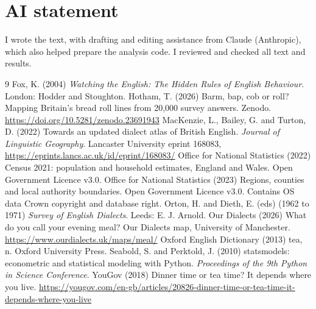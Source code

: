 \documentclass[11pt,a4paper]{article}
\begin{document}
\section*{AI statement}
I wrote the text, with drafting and editing assistance from Claude (Anthropic), which also helped prepare the analysis code. I reviewed and checked all text and results.

\begin{thebibliography}{9}
 Fox, K. (2004) \emph{Watching the English: The Hidden Rules of English Behaviour}. London: Hodder and Stoughton.
 Hotham, T. (2026) Barm, bap, cob or roll? Mapping Britain's bread roll lines from 20,000 survey answers. Zenodo. \url{https://doi.org/10.5281/zenodo.23691943}
 MacKenzie, L., Bailey, G. and Turton, D. (2022) Towards an updated dialect atlas of British English. \emph{Journal of Linguistic Geography}. Lancaster University eprint 168083, \url{https://eprints.lancs.ac.uk/id/eprint/168083/}
 Office for National Statistics (2022) Census 2021: population and household estimates, England and Wales. Open Government Licence v3.0.
 Office for National Statistics (2023) Regions, counties and local authority boundaries. Open Government Licence v3.0. Contains OS data \textcopyright{} Crown copyright and database right.
 Orton, H. and Dieth, E. (eds) (1962 to 1971) \emph{Survey of English Dialects}. Leeds: E. J. Arnold.
 Our Dialects (2026) What do you call your evening meal? Our Dialects map, University of Manchester. \url{https://www.ourdialects.uk/maps/meal/}
 Oxford English Dictionary (2013) tea, n. Oxford University Press.
 Seabold, S. and Perktold, J. (2010) statsmodels: econometric and statistical modeling with Python. \emph{Proceedings of the 9th Python in Science Conference}.
 YouGov (2018) Dinner time or tea time? It depends where you live. \url{https://yougov.com/en-gb/articles/20826-dinner-time-or-tea-time-it-depends-where-you-live}
\end{thebibliography}
\end{document}
